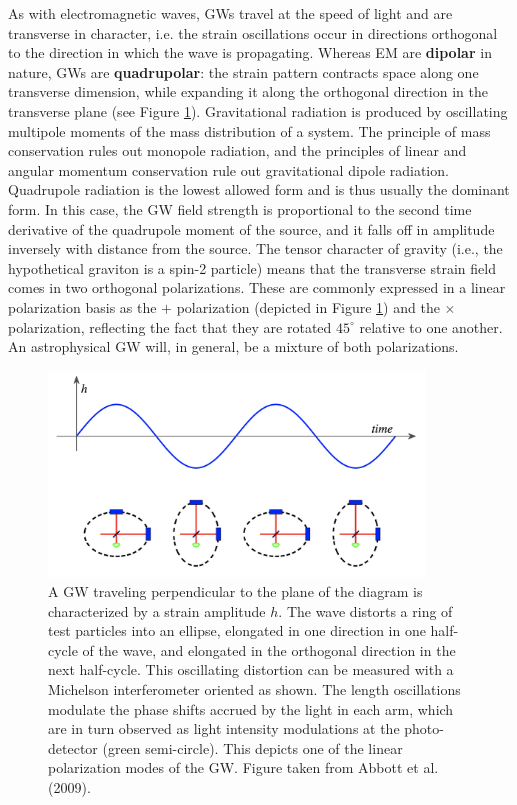 \documentclass[a4paper,10pt]{article}
\begin{document}
{\noindent}As with electromagnetic waves, GWs travel at the speed of light and are transverse in character, i.e. the strain oscillations occur in directions orthogonal to the direction in which the wave is propagating. Whereas EM are \textbf{dipolar} in nature, GWs are \textbf{quadrupolar}: the strain pattern contracts space along one transverse dimension, while expanding it along the orthogonal direction in the transverse plane (see Figure \ref{fig:straindiagram}). Gravitational radiation is produced by oscillating multipole moments of the mass distribution of a system. The principle of mass conservation rules out monopole radiation, and the principles of linear and angular momentum conservation rule out gravitational dipole radiation. Quadrupole radiation is the lowest allowed form and is thus usually the dominant form. In this case, the GW field strength is proportional to the second time derivative of the quadrupole moment of the source, and it falls off in amplitude inversely with distance from the source. The tensor character of gravity (i.e., the hypothetical graviton is a spin-2 particle) means that the transverse strain field comes in two orthogonal polarizations. These are commonly expressed in a linear polarization basis as the $+$ polarization (depicted in Figure \ref{fig:straindiagram}) and the $\times$ polarization, reflecting the fact that they are rotated $45^\circ$ relative to one another. An astrophysical GW will, in general, be a mixture of both polarizations. 

\begin{figure}[t]
    \centering
    \includegraphics[width=10cm]{figures/StrainDiagram.png}
    \caption{\footnotesize{A GW traveling perpendicular to the plane of the diagram is characterized by a strain amplitude $h$. The wave distorts a ring of test particles into an ellipse, elongated in one direction in one half-cycle of the wave, and elongated in the orthogonal direction in the next half-cycle. This oscillating distortion can be measured with a Michelson interferometer oriented as shown. The length oscillations modulate the phase shifts accrued by the light in each arm, which are in turn observed as light intensity modulations at the photo-detector (green semi-circle). This depicts one of the linear polarization modes of the GW. Figure taken from Abbott et al. (2009).}}
    \label{fig:straindiagram}
\end{figure}
\end{document}
